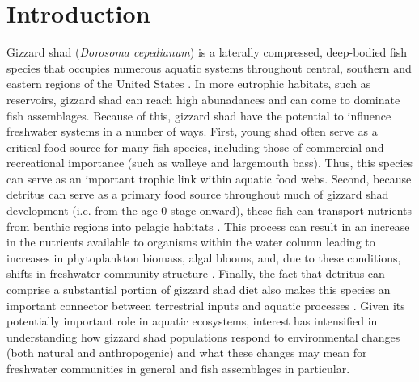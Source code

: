 \documentclass[preprint,review,12pt,authoryear]{elsarticle}
\begin{document}
\section{Introduction}
Gizzard shad (\emph{Dorosoma cepedianum}) is a laterally compressed, deep-bodied fish species that occupies numerous aquatic systems throughout central, southern and eastern regions of the United States \citep{pierce1981aspects,vanni2005linking}.  In more eutrophic habitats, such as reservoirs, gizzard shad can reach high abunadances and can come to dominate fish assemblages. Because of this, gizzard shad have the potential to influence freshwater systems in a number of ways. 
First, young shad often serve as a critical food source for many fish species, including those of commercial and recreational importance (such as walleye and largemouth bass)\citep{jester1972life}. Thus, this species can serve as an important trophic link within aquatic food webs.
Second, because detritus can serve as a primary food source throughout much of gizzard shad development (i.e. from the age-0 stage onward), these fish can transport nutrients
from benthic regions into pelagic habitats \citep{mather1995regeneration, schaus2000effects, vanni2005linking}. 
This process can result in an increase in the nutrients available to organisms within the water column leading to increases in phytoplankton biomass, algal blooms, and, due to these conditions, shifts in freshwater community structure \citep{aday2003direct, schaus2000effects}. 
Finally, the fact that detritus can comprise a substantial portion of gizzard shad diet also makes this species an important connector between terrestrial inputs and aquatic processes \citep{schaus2000effects}.
Given its potentially important role in aquatic ecosystems, interest has intensified in understanding how gizzard shad populations respond to environmental changes (both natural and anthropogenic) and what these changes may mean for freshwater communities in general and fish assemblages in particular.
\end{document}
